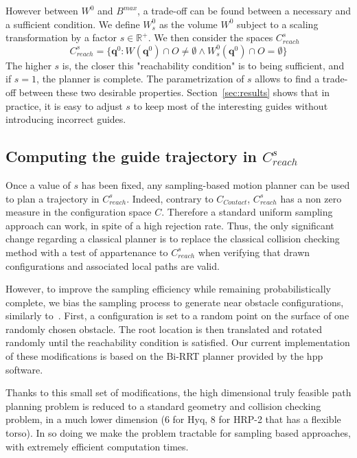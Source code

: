 However between $W^0$ and $B^{max}$, a trade-off can be found between a necessary and a sufficient condition. We define $W^0_s$ as the volume $W^0$ subject to a scaling transformation by a factor $s \in \mathbb{R}^+$. 
%
We then consider the spaces $C_{reach}^s$
 \begin{equation}
C_{reach}^s = \{ \mathbf{q}^0 : W(\mathbf{q}^{0}) \cap O \neq \emptyset \wedge W^0_s(\mathbf{q}^{0}) \cap O = \emptyset \} %
\end{equation}
%
The higher $s$ is, the closer this "reachability condition" is to being sufficient, and if $s=1$, the planner is complete. The parametrization of $s$ allows to find a trade-off between these two desirable properties.
Section~\ref{sec:results} shows that in practice, it is easy to adjust $s$ to keep most of the interesting guides without introducing incorrect guides.

\subsection{Computing the guide trajectory in $C_{reach}^s$}
Once a value of $s$ has been fixed, any sampling-based motion planner can be used to plan a trajectory in $C_{reach}^s$. 
Indeed, contrary to $C_{Contact}$,  $C_{reach}^s$ has a non zero measure in the configuration space $C$. Therefore a standard uniform sampling approach
can work, in spite of a high rejection rate. 
Thus, the only significant change regarding a classical planner is to replace the classical collision checking method with a test of appartenance to $C_{reach}^s$ when verifying
that drawn configurations and associated local paths are valid.

However, to improve the sampling efficiency while remaining probabilistically complete, we bias the sampling process to generate near obstacle configurations, similarly to~\cite{Amato98choosinggood}.
First, a configuration is set to a random point on the surface of one randomly chosen obstacle. The root location is then translated and rotated randomly until the reachability condition is satisfied.
Our current implementation of these modifications is based on the Bi-RRT planner provided by the hpp software.

Thanks to this small set of modifications, the high dimensional truly feasible path planning problem is reduced to a standard geometry and collision checking problem, in a much lower dimension (6 for Hyq, 8 for HRP-2 that has a flexible torso). In so doing we make the problem tractable for sampling based approaches, with extremely efficient computation times.

